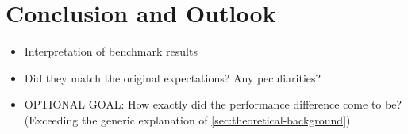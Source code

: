  
\cleardoubleoddpage
\chapter{Conclusion and Outlook}
\label{sec:conclusion}

\begin{itemize}
  \item Interpretation of benchmark results
  \item Did they match the original expectations? Any peculiarities?
  \item OPTIONAL GOAL: How exactly did the performance difference come to be? (Exceeding the generic explanation of \autoref{sec:theoretical-background})
\end{itemize}

